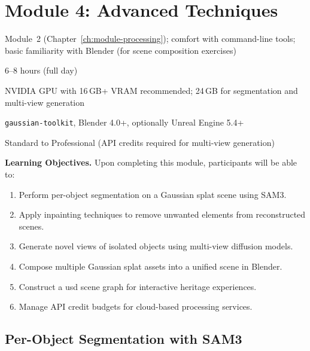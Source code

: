 \chapter{Module 4: Advanced Techniques}
\label{ch:module-advanced}

\begin{tcolorbox}[
  enhanced,
  colback=LightGrey,
  colframe=MidGrey,
  fonttitle=\bfseries\sffamily,
  title={Module Information},
  sharp corners=south,
  boxrule=0.6pt
]
\begin{description}[font=\sffamily\bfseries, leftmargin=4cm, style=sameline]
  \item[Prerequisites] Module~2 (Chapter~\ref{ch:module-processing}); comfort with command-line tools; basic familiarity with Blender (for scene composition exercises)
  \item[Duration] 6--8 hours (full day)
  \item[Hardware] NVIDIA GPU with 16\,GB+ VRAM recommended; 24\,GB for segmentation and multi-view generation
  \item[Software] \texttt{gaussian-toolkit}, Blender 4.0+, optionally Unreal Engine 5.4+
  \item[Budget tier] Standard to Professional (API credits required for multi-view generation)
\end{description}
\end{tcolorbox}

\medskip

\noindent\textbf{Learning Objectives.} Upon completing this module, participants will be able to:
\begin{enumerate}
  \item Perform per-object segmentation on a Gaussian splat scene using SAM3.
  \item Apply inpainting techniques to remove unwanted elements from reconstructed scenes.
  \item Generate novel views of isolated objects using multi-view diffusion models.
  \item Compose multiple Gaussian splat assets into a unified scene in Blender.
  \item Construct a \acrshort{usd} scene graph for interactive heritage experiences.
  \item Manage API credit budgets for cloud-based processing services.
\end{enumerate}

\section{Per-Object Segmentation with SAM3}
\label{sec:adv-sam3}


